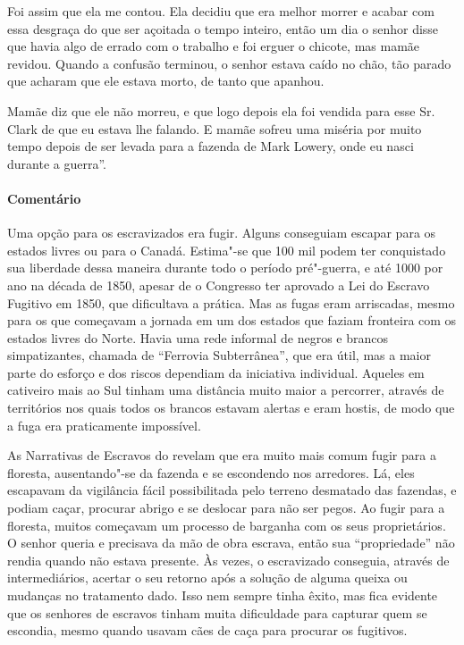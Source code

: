 Foi assim que ela me contou. Ela decidiu que era melhor morrer e acabar
com essa desgraça do que ser açoitada o tempo inteiro, então um dia o
senhor disse que havia algo de errado com o trabalho e foi erguer o
chicote, mas mamãe revidou. Quando a confusão terminou, o senhor estava
caído no chão, tão parado que acharam que ele estava morto, de tanto que
apanhou.

Mamãe diz que ele não morreu, e que logo depois ela foi vendida para
esse Sr. Clark de que eu estava lhe falando. E mamãe sofreu uma miséria
por muito tempo depois de ser levada para a fazenda de Mark Lowery, onde
eu nasci durante a guerra''.

\paragraph{Comentário}\quad
{\small
Uma opção para os escravizados era fugir. Alguns conseguiam
escapar para os estados livres ou para o Canadá. Estima"-se que 100 mil
podem ter conquistado sua liberdade dessa maneira durante todo o período
pré"-guerra, e até 1000 por ano na década de 1850, apesar de o Congresso
ter aprovado a Lei do Escravo Fugitivo em 1850, que dificultava a
prática. Mas as fugas eram arriscadas, mesmo para os que
começavam a jornada em um dos estados que faziam fronteira com os
estados livres do Norte. Havia uma rede informal de negros e brancos
simpatizantes, chamada de ``Ferrovia Subterrânea'', que era útil, mas a
maior parte do esforço e dos riscos dependiam da iniciativa individual.
Aqueles em cativeiro mais ao Sul tinham uma distância muito maior a
percorrer, através de territórios nos quais todos os brancos estavam
alertas e eram hostis, de modo que a fuga era praticamente impossível.

As Narrativas de Escravos do  revelam que era muito mais comum
fugir para a floresta, ausentando"-se da fazenda e se
escondendo nos arredores. Lá, eles escapavam da vigilância fácil
possibilitada pelo terreno desmatado das fazendas, e podiam caçar,
procurar abrigo e se deslocar para não ser pegos. Ao fugir para a
floresta, muitos começavam um processo de barganha com os seus
proprietários. O senhor queria e precisava da mão de obra escrava, então
sua ``propriedade'' não rendia quando não estava presente. Às
vezes, o escravizado conseguia, através de intermediários, acertar o seu
retorno após a solução de alguma queixa ou mudanças no tratamento dado.
Isso nem sempre tinha êxito, mas fica evidente que os senhores de
escravos tinham muita dificuldade para capturar quem se escondia, mesmo
quando usavam cães de caça para procurar os fugitivos.
}

